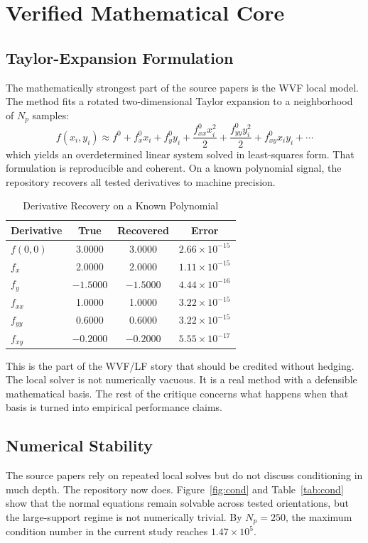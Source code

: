 \documentclass[conference]{IEEEtran}
\begin{document}
\section{Verified Mathematical Core}
\subsection{Taylor-Expansion Formulation}
The mathematically strongest part of the source papers is the WVF local model. The method fits a rotated two-dimensional Taylor expansion to a neighborhood of $N_p$ samples:
\begin{equation}
f(x_i, y_i) \approx f^0 + f_x^0 x_i + f_y^0 y_i + \frac{f_{xx}^0 x_i^2}{2} + \frac{f_{yy}^0 y_i^2}{2} + f_{xy}^0 x_i y_i + \cdots
\label{eq:taylor}
\end{equation}
which yields an overdetermined linear system solved in least-squares form. That formulation is reproducible and coherent. On a known polynomial signal, the repository recovers all tested derivatives to machine precision.

\begin{table}[t]
\centering
\caption{Derivative Recovery on a Known Polynomial}
\label{tab:taylor}
\scriptsize
\begin{tabular}{lccc}
\toprule
Derivative & True & Recovered & Error \\
\midrule
$f(0,0)$ & 3.0000 & 3.0000 & $2.66 \times 10^{-15}$ \\
$f_x$    & 2.0000 & 2.0000 & $1.11 \times 10^{-15}$ \\
$f_y$    & $-1.5000$ & $-1.5000$ & $4.44 \times 10^{-16}$ \\
$f_{xx}$ & 1.0000 & 1.0000 & $3.22 \times 10^{-15}$ \\
$f_{yy}$ & 0.6000 & 0.6000 & $3.22 \times 10^{-15}$ \\
$f_{xy}$ & $-0.2000$ & $-0.2000$ & $5.55 \times 10^{-17}$ \\
\bottomrule
\end{tabular}
\end{table}

This is the part of the WVF/LF story that should be credited without hedging. The local solver is not numerically vacuous. It is a real method with a defensible mathematical basis. The rest of the critique concerns what happens when that basis is turned into empirical performance claims.

\subsection{Numerical Stability}
The source papers rely on repeated local solves but do not discuss conditioning in much depth. The repository now does. Figure~\ref{fig:cond} and Table~\ref{tab:cond} show that the normal equations remain solvable across tested orientations, but the large-support regime is not numerically trivial. By $N_p=250$, the maximum condition number in the current study reaches $1.47 \times 10^5$.
\end{document}
